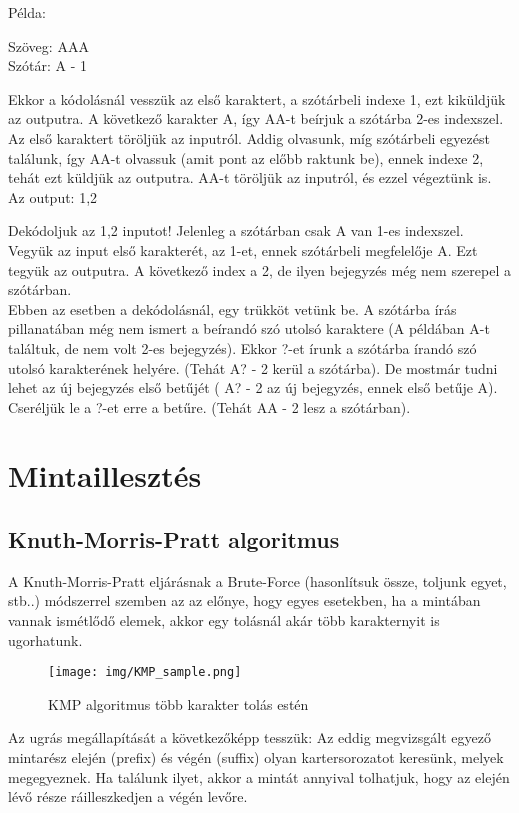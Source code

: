 \documentclass[margin=0px]{article}
\begin{document}
\begin{description}
					Példa:
					
					Szöveg: AAA\\
					Szótár: A - 1
					
					Ekkor a kódolásnál vesszük az első karaktert, a szótárbeli indexe 1, ezt kiküldjük az outputra. A következő karakter A, így AA-t beírjuk a szótárba 2-es indexszel. Az első karaktert töröljük az inputról. Addig olvasunk, míg szótárbeli egyezést találunk, így AA-t olvassuk (amit pont az előbb raktunk be), ennek indexe 2, tehát ezt küldjük az outputra. AA-t töröljük az inputról, és ezzel végeztünk is. Az output: 1,2
					
					Dekódoljuk az 1,2 inputot! Jelenleg a szótárban csak A van 1-es indexszel. Vegyük az input első karakterét, az 1-et, ennek szótárbeli megfelelője A. Ezt tegyük az outputra. A következő index a 2, de ilyen bejegyzés még nem szerepel a szótárban. \\
					
					Ebben az esetben a dekódolásnál, egy trükköt vetünk be. A szótárba írás pillanatában még nem ismert a beírandó szó utolsó karaktere (A példában A-t találtuk, de nem volt 2-es bejegyzés). Ekkor ?-et írunk a szótárba írandó szó utolsó karakterének helyére. (Tehát A? - 2 kerül a szótárba). De mostmár tudni lehet az új bejegyzés első betűjét ( A? - 2 az új bejegyzés, ennek első betűje A). Cseréljük le a ?-et erre a betűre. (Tehát AA - 2 lesz a szótárban).
			\end{description}
	\section{Mintaillesztés}
		\subsection{Knuth-Morris-Pratt algoritmus}
			A Knuth-Morris-Pratt eljárásnak a Brute-Force (hasonlítsuk össze, toljunk egyet, stb..) módszerrel szemben az az előnye, hogy egyes esetekben, ha a mintában vannak ismétlődő elemek, akkor egy tolásnál akár több karakternyit is ugorhatunk.
			
			\begin{figure}[H]
				\centering
				\texttt{[image: img/KMP\_sample.png]}
				\caption{KMP algoritmus több karakter tolás estén}
				\label{fig:KMP_sample}
			\end{figure}
			
			Az ugrás megállapítását a következőképp tesszük: Az eddig megvizsgált egyező mintarész elején (prefix) és végén (suffix) olyan kartersorozatot keresünk, melyek megegyeznek. Ha találunk ilyet, akkor a mintát annyival tolhatjuk, hogy az elején lévő része ráilleszkedjen a végén levőre.
			
\end{document}

